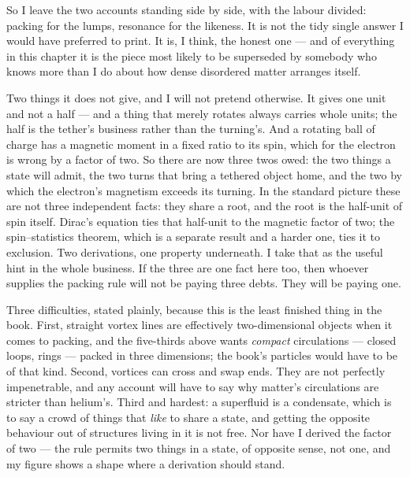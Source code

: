 So I leave the two accounts standing side by side, with the labour divided: packing for the lumps, resonance for the likeness. It is not the tidy single answer I would have preferred to print. It is, I think, the honest one --- and of everything in this chapter it is the piece most likely to be superseded by somebody who knows more than I do about how dense disordered matter arranges itself.


Two things it does not give, and I will not pretend otherwise. It gives one unit and not a half --- and a thing that merely rotates always carries whole units; the half is the tether's business rather than the turning's. And a rotating ball of charge has a magnetic moment in a fixed ratio to its spin, which for the electron is wrong by a factor of two. So there are now three twos owed: the two things a state will admit, the two turns that bring a tethered object home, and the two by which the electron's magnetism exceeds its turning. In the standard picture these are not three independent facts: they share a root, and the root is the half-unit of spin itself. Dirac's equation ties that half-unit to the magnetic factor of two; the spin--statistics theorem, which is a separate result and a harder one, ties it to exclusion. Two derivations, one property underneath. I take that as the useful hint in the whole business. If the three are one fact here too, then whoever supplies the packing rule will not be paying three debts. They will be paying one.


Three difficulties, stated plainly, because this is the least finished thing in the book. First, straight vortex lines are effectively two-dimensional objects when it comes to packing, and the five-thirds above wants \emph{compact} circulations --- closed loops, rings --- packed in three dimensions; the book's particles would have to be of that kind. Second, vortices can cross and swap ends. They are not perfectly impenetrable, and any account will have to say why matter's circulations are stricter than helium's. Third and hardest: a superfluid is a condensate, which is to say a crowd of things that \emph{like} to share a state, and getting the opposite behaviour out of structures living in it is not free. Nor have I derived the factor of two --- the rule permits two things in a state, of opposite sense, not one, and my figure shows a shape where a derivation should stand.

